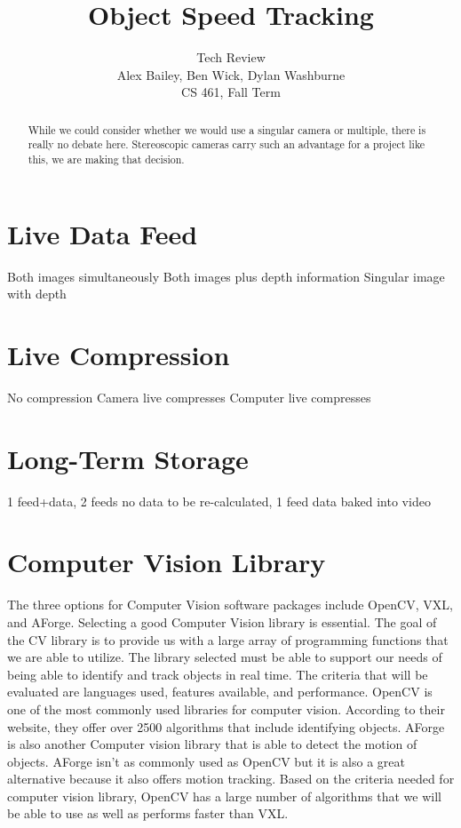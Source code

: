 \documentclass[letterpaper,10pt,onecolumn,draftclsnofoot]{IEEEtran}
\title{Object Speed Tracking}
\author{Tech Review\\Alex Bailey, Ben Wick, Dylan Washburne\\CS 461, Fall Term}
\begin{document}
\begin{titlepage}

\maketitle

\begin{abstract}
While we could consider whether we would use a singular camera or multiple, there is really no debate here.
Stereoscopic cameras carry such an advantage for a project like this, we are making that decision.
 
\end{abstract}

\end{titlepage}

\section{Live Data Feed} %

Both images simultaneously
Both images plus depth information
Singular image with depth

\section{Live Compression} %

No compression
Camera live compresses
Computer live compresses

\section{Long-Term Storage}%

1 feed+data, 
2 feeds no data to be re-calculated, 
1 feed data baked into video

\section{Computer Vision Library} %

The three options for Computer Vision software packages include OpenCV, VXL, and AForge.
Selecting a good Computer Vision library is essential. The goal of the CV library is to provide us with a large array of programming functions that we are able to utilize.
The library selected must be able to support our needs of being able to identify and track objects in real time.
The criteria that will be evaluated are languages used, features available, and performance.
OpenCV is one of the most commonly used libraries for computer vision.
According to their website, they offer over 2500 algorithms that include identifying objects.
AForge is also another Computer vision library that is able to detect the motion of objects.
AForge isn't as commonly used as OpenCV but it is also a great alternative because it also offers motion tracking.
Based on the criteria needed for computer vision library, OpenCV has a large number of algorithms that we will be able to use as well as performs faster than VXL.
\end{document}
